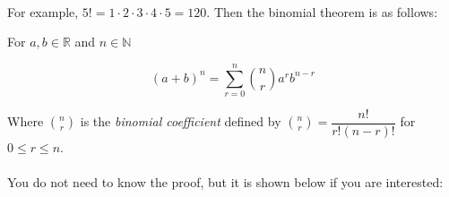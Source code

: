 \documentclass[12pt, a4paper, titlepage, twoside]{article}
\newcommand*{\N}{\mathbb{N}}
\newcommand*{\R}{\mathbb{R}}
\begin{document}
	\paragraph{}
	For example, $5! = 1 \cdot 2 \cdot 3 \cdot 4 \cdot 5 = 120$.
	Then the binomial theorem is as follows:\\
	
	\begin{kp}
		For $a,b \in \R$ and $n \in \N$
		
		$$(a+b)^n = \sum_{r=0}^n {n \choose r} a^r b^{n-r}$$
		
		Where ${n \choose r}$ is the \textit{binomial coefficient} defined by $\displaystyle {n \choose r} = \dfrac{n!}{r!(n-r)!}$ for
		$0 \leq r \leq n$.
	\end{kp}
	
	\paragraph{}
	You do not need to know the proof, but it is shown below if you are interested:\\
	
\end{document}
